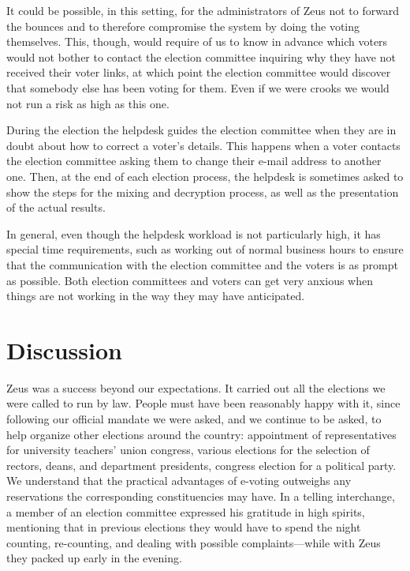 \documentclass[letterpaper,10pt]{article}
\begin{document}
It could be possible, in this setting, for the administrators of Zeus
not to forward the bounces and to therefore compromise the system by
doing the voting themselves. This, though, would require of us to know
in advance which voters would not bother to contact the election
committee inquiring why they have not received their voter links, at
which point the election committee would discover that somebody else
has been voting for them. Even if we were crooks we would not run a
risk as high as this one.

During the election the helpdesk guides the election committee when
they are in doubt about how to correct a voter's details. This happens
when a voter contacts the election committee asking them to change
their e-mail address to another one. Then, at the end of each election
process, the helpdesk is sometimes asked to show the steps for the
mixing and decryption process, as well as the presentation of the
actual results.

In general, even though the helpdesk workload is not particularly
high, it has special time requirements, such as working out of normal
business hours to ensure that the communication with the election
committee and the voters is as prompt as possible. Both election
committees and voters can get very anxious when things are not working
in the way they may have anticipated.



\section{Discussion}
\label{sec:discussion}

Zeus was a success beyond our expectations. It carried out all the
elections we were called to run by law. People must have been
reasonably happy with it, since following our official mandate we were
asked, and we continue to be asked, to help organize other elections
around the country: appointment of representatives for university
teachers' union congress, various elections for the selection of
rectors, deans, and department presidents, congress election for a
political party. We understand that the practical advantages of
e-voting outweighs any reservations the corresponding constituencies
may have. In a telling interchange, a member of an election committee
expressed his gratitude in high spirits, mentioning that in previous
elections they would have to spend the night counting, re-counting,
and dealing with possible complaints---while with Zeus they packed up
early in the evening.
\end{document}
